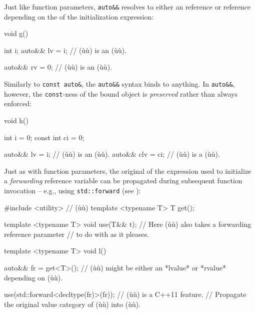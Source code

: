 \noindent Just like function parameters, \lstinline!auto&&! resolves to either an
 reference or  reference depending on the
 of the initialization expression:

\begin{emcppslisting}
void g()
{
    int i;
    auto&& lv = i;  // (ù{}ù) is an (ù{}ù).

    auto&& rv = 0;  // (ù{}ù) is an (ù{}ù).
}
\end{emcppslisting}

\noindent Similarly to \lstinline!const!~\lstinline!auto&!, the \lstinline!auto&&!
syntax binds to anything. In \lstinline!auto&&!, however, the
\lstinline!const!-ness of the bound object is \emph{preserved} rather than
always enforced:

\begin{emcppslisting}
void h()
{
    int        i = 0;
    const int ci = 0;

    auto&& lv  = i;   // (ù{}ù) is an (ù{}ù).
    auto&& clv = ci;  // (ù{}ù) is a (ù{}ù).
}
\end{emcppslisting}

\noindent Just as with function parameters, the original 
of the expression used to initialize a \emph{forwarding} reference
variable can be propagated during subsequent function invocation --
e.g., using \lstinline!std::forward! (see ):

\begin{emcppshiddenlisting}[emcppsbatch=e5]
#include <utility>  // (ù{}ù)
template <typename T>
T get();
\end{emcppshiddenlisting}
\begin{emcppslisting}[emcppsbatch=e5]
template <typename T>
void use(T&& t); // Here (ù{}ù) also takes a forwarding reference parameter
                 // to do with as it pleases.

template <typename T>
void l()
{
    auto&& fr = get<T>();
        // (ù{}ù) might be either an *lvalue* or *rvalue* depending on (ù{}ù).

    use(std::forward<decltype(fr)>(fr));  // (ù{}ù) is a C++11 feature.
        // Propagate the original value category of (ù{}ù) into (ù{}ù).
}
\end{emcppslisting}

